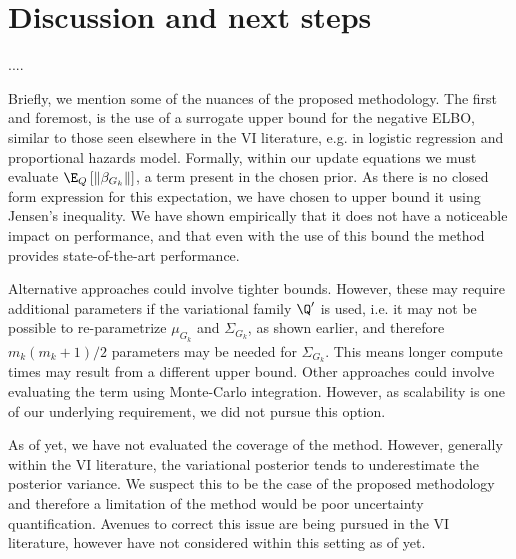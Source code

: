 \newpage
\section{Discussion and next steps}

....

Briefly, we mention some of the nuances of the proposed methodology. The first and foremost, is the use of a surrogate upper bound for the negative ELBO, similar to those seen elsewhere in the VI literature, e.g. in logistic regression and proportional hazards model. Formally, within our update equations we must evaluate $\E_Q \left[ \| \beta_{G_k} \| \right]$, a term present in the chosen prior. As there is no closed form expression for this expectation, we have chosen to upper bound it using Jensen's inequality. We have shown empirically that it does not have a noticeable impact on performance, and that even with the use of this bound the method provides state-of-the-art performance.

Alternative approaches could involve tighter bounds. However, these may require additional parameters if the variational family $\Q'$ is used, i.e. it may not be possible to re-parametrize $\mu_{G_k}$ and $\Sigma_{G_k}$, as shown earlier, and therefore $m_k (m_k+ 1)/2$ parameters may be needed for $\Sigma_{G_k}$. This means longer compute times may result from a different upper bound. Other approaches could involve evaluating the term using Monte-Carlo integration. However, as scalability is one of our underlying requirement, we did not pursue this option.

As of yet, we have not evaluated the coverage of the method. However, generally within the VI literature, the variational posterior tends to underestimate the posterior variance. We suspect this to be the case of the proposed methodology and therefore a limitation of the method would be poor uncertainty quantification. Avenues to correct this issue are being pursued in the VI literature, however have not considered within this setting as of yet.


